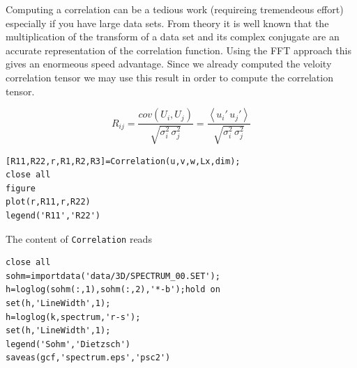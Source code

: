 \documentclass[preprint,12pt,ntfdMod]{elsarticle}
\begin{document}
\begin{par}
Computing a correlation can be a tedious work (requireing tremendeous effort) especially if you have large data sets. From theory it is well known that the multiplication of the transform of a data set and its complex conjugate are an accurate representation of the correlation function. Using the FFT approach this gives an enormeous speed advantage. Since we already computed the veloity correlation tensor we may use this result in order to compute the correlation tensor.
\end{par} \vspace{1em}
\begin{par}

  \begin{equation}
      R_{ij} = \frac{cov(U_i,U_j)}{\sqrt{\sigma_i^2\,\sigma_j^2}}
             = \frac{\left<u_i'\,u_j'\right>}{\sqrt{\sigma_i^2\,\sigma_j^2}}
  \end{equation}

\end{par} \vspace{1em}
\begin{lstlisting}
[R11,R22,r,R1,R2,R3]=Correlation(u,v,w,Lx,dim);
close all
figure
plot(r,R11,r,R22)
legend('R11','R22')
\end{lstlisting}
\begin{par}

The content of \verb|Correlation| reads


\end{par} \vspace{1em}
\begin{lstlisting}
close all
sohm=importdata('data/3D/SPECTRUM_00.SET');
h=loglog(sohm(:,1),sohm(:,2),'*-b');hold on
set(h,'LineWidth',1);
h=loglog(k,spectrum,'r-s');
set(h,'LineWidth',1);
legend('Sohm','Dietzsch')
saveas(gcf,'spectrum.eps','psc2')
\end{lstlisting}
\end{document}
